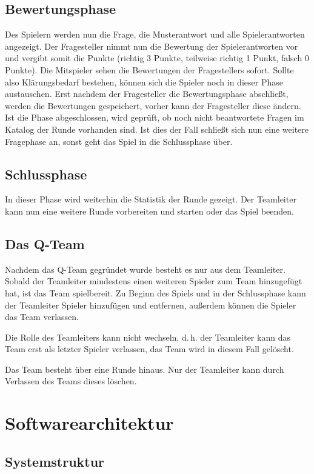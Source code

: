 \documentclass[a4paper,11pt,listof=numbered,glossary=totoc,parskip=half,toc=bib]{scrreprt}
\newcommand{\dash}{\mbox{d.\,h.}\xspace}
\begin{document}
	\section{Bewertungsphase}
	Des Spielern werden nun die Frage, die Musterantwort und alle Spielerantworten angezeigt. Der Fragesteller nimmt nun die Bewertung der Spielerantworten vor und vergibt somit die Punkte (richtig 3 Punkte, teilweise richtig 1 Punkt, falsch 0 Punkte). Die Mitspieler sehen die Bewertungen der Fragestellers sofort. Sollte also Klärungsbedarf bestehen, können sich die Spieler noch in dieser Phase austauschen. Erst nachdem der Fragesteller die Bewertungsphase abschließt, werden die Bewertungen gespeichert, vorher kann der Fragesteller diese ändern. Ist die Phase abgeschlossen, wird geprüft, ob noch nicht beantwortete Fragen im Katalog der Runde vorhanden sind. Ist dies der Fall schließt sich nun eine weitere Fragephase an, sonst geht das Spiel in die Schlussphase über.
	
	\section{Schlussphase}
	In dieser Phase wird weiterhin die Statistik der Runde gezeigt. Der Teamleiter kann nun eine weitere Runde vorbereiten und starten oder das Spiel beenden.
	
	\section{Das Q-Team}
	Nachdem das Q-Team gegründet wurde besteht es nur aus dem Teamleiter. Sobald der Teamleiter mindestens einen weiteren Spieler zum Team hinzugefügt hat, ist das Team spielbereit. Zu Beginn des Spiels und in der Schlussphase kann der Teamleiter Spieler hinzufügen und entfernen, außerdem können die Spieler das Team verlassen.
	
	Die Rolle des Teamleiters kann nicht wechseln, \dash der Teamleiter kann das Team erst als letzter Spieler verlassen, das Team wird in diesem Fall gelöscht.
	
	Das Team besteht über eine Runde hinaus. Nur der Teamleiter kann durch Verlassen des Teams dieses löschen.
	
	\chapter{Softwarearchitektur}
	\section{Systemstruktur}
\end{document}
